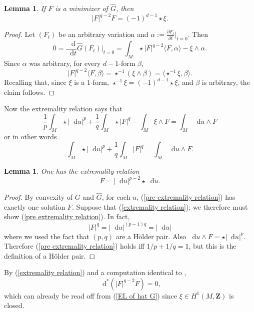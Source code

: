 \documentclass[reqno,12pt]{amsart}
\newcommand{\ZZ}{\mathbf{Z}}
\newcommand*\dif{\mathop{}\!\mathrm{d}}
\newtheorem{lemma}[theorem]{Lemma}
\theoremstyle{definition}
\numberwithin{equation}{section}
\begin{document}
\begin{lemma}
If $F$ is a minimizer of $\hat G$, then
\begin{equation}\label{EL of hat G}
|F|^{q - 2} F = (-1)^{d - 1} \star \xi.
\end{equation}
\end{lemma}
\begin{proof}
Let $(F_t)$ be an arbitrary variation and $\alpha := \frac{\partial F_t}{\partial t}|_{t = 0}$. Then 
$$0 = \frac{\dif}{\dif t} \hat G(F_t)\bigg|_{t = 0} = \int_M \star |F|^{q - 2} \langle F, \alpha \rangle - \xi \wedge \alpha.$$
Since $\alpha$ was arbitrary, for every $d-1$-form $\beta$,
$$|F|^{q - 2} \langle F, \beta\rangle = \star^{-1}(\xi \wedge \beta) = \langle \star^{-1} \xi, \beta\rangle.$$
Recalling that, since $\xi$ is a $1$-form, $\star^{-1} \xi = (-1)^{d - 1} \star \xi$, and $\beta$ is arbitrary, the claim follows.
\end{proof}

Now the extremality relation \cite[(III.4.23)]{Ekeland99} says that 
$$\frac{1}{p} \int_M \star |\dif u|^p + \frac{1}{q} \int_M \star |F|^q - \int_M \xi \wedge F = \int_M \dif \tilde u \wedge F$$
or in other words 
\begin{equation}\label{pre extremality relation}
\int_M \star |\dif u|^p + \frac{1}{q} \int_M |F|^q = \int_M \dif u \wedge F.
\end{equation}

\begin{lemma}
One has the extremality relation
\begin{equation}\label{extremality relation}
F = |\dif u|^{p - 2} \star \dif u.
\end{equation}
\end{lemma}
\begin{proof}
By convexity of $G$ and $\hat G$, for each $u$, (\ref{pre extremality relation}) has exactly one solution $F$.
Suppose that (\ref{extremality relation}); we therefore must show (\ref{pre extremality relation}).
In fact,
$$|F|^q = |\dif u|^{(p - 1)q} = |\dif u|$$
where we used the fact that $(p, q)$ are a H\"older pair. Also $\dif u \wedge F = \star |\dif u|^p$.
Therefore (\ref{pre extremality relation}) holds iff $1/p + 1/q = 1$, but this is the definition of a H\"older pair.
\end{proof}

By (\ref{extremality relation}) and a computation identical to \cite[Lemma 3.2]{Daskalopolous20},
\begin{equation}\label{first order qLap}
\dif^* (|F|^{q - 2} F) = 0,
\end{equation}
which can already be read off from (\ref{EL of hat G}) since $\xi \in H^1(M, \ZZ)$ is closed.
\end{document}
